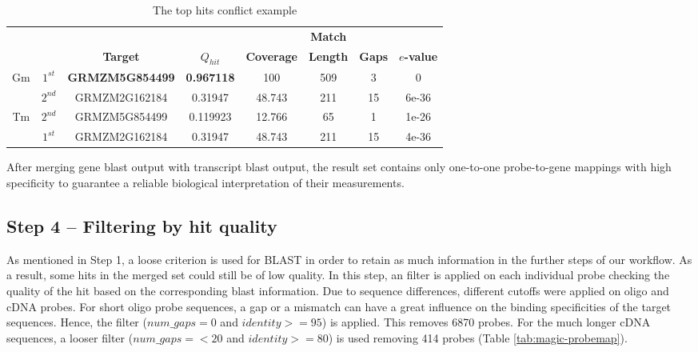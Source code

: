 \begin{table}
	\centering
	\begin{footnotesize}
	\caption{The top hits conflict example} 
	\label{tab:magic-conflict-tops}
	\begin{tabular}{@{}cc|cccccc@{}}
	\toprule
	& & & & & \textbf{Match} & & \\
	& & \textbf{Target} & \textbf{$Q_{hit}$} & \textbf{Coverage} & 
	\textbf{Length} & \textbf{Gaps} & \textbf{$e$-value} \\ 
	\midrule
	Gm &
	$1^{st}$ & \textbf{GRMZM5G854499} & \textbf{0.967118} & 100 & 509 & 3 & 0 \\
	& $2^{nd}$ & GRMZM2G162184 & 0.31947 & 48.743 & 211 & 15 & 6e-36 \\
	\hline
	Tm & 
	$2^{nd}$ & GRMZM5G854499 & 0.119923 & 12.766 & 65 & 1 & 1e-26 \\
	& $1^{st}$ & GRMZM2G162184 & 0.31947 & 48.743 & 211 & 15 & 4e-36 \\
	\bottomrule
	\end{tabular}
	\end{footnotesize}
\end{table}

After merging gene blast output with transcript blast output, the result set 
contains only one-to-one probe-to-gene mappings with high specificity to 
guarantee a reliable biological interpretation of their measurements. 



\subsection{Step 4 – Filtering by hit quality}


As mentioned in Step 1, a loose criterion is used for BLAST in order to retain 
as much information in the further steps of our workflow. 
As a result, some hits in the merged set could still be of low quality. 
In this step, an filter is applied on each individual probe checking the 
quality of the hit based on the corresponding blast information.
Due to sequence differences, different cutoffs were applied on oligo and cDNA 
probes. 
For short oligo probe sequences, a gap or a mismatch can have a great influence 
on the binding specificities of the target sequences. 
Hence, the filter ($num\_gaps = 0$ and $identity >= 95$) is applied. This 
removes 6870 probes. 
For the much longer cDNA sequences, a looser filter ($num\_gaps =< 20$ and 
$identity >= 80$) is used removing 414 probes (Table 
\ref{tab:magic-probemap}). 



